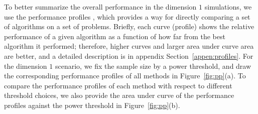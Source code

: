 \documentclass[11pt]{article}
\begin{document}
To better summarize the overall performance in the dimension $1$ simulations, we use the performance profiles \cite{DolanMore2002}, which provides a way for directly comparing a set of algorithms on a set of problems.  Briefly, each curve (profile) shows the relative performance of a given algorithm as a function of how far from the best algorithm it performed; therefore, higher curves and larger area under curve area are better, and a detailed description is in appendix Section~\ref{appen:profiles}. For the dimension $1$ scenario, we fix the sample size by a power threshold, and draw the corresponding performance profiles of all methods in Figure~\ref{fig:pp}(a). To compare the performance profiles of each method with respect to different threshold choices, we also provide the area under curve of the performance profiles against the power threshold in Figure~\ref{fig:pp}(b).
\end{document}

